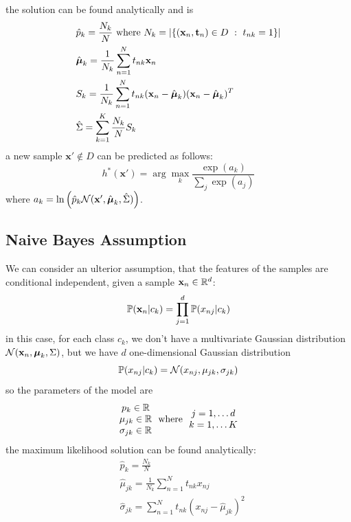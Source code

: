 \documentclass[10pt, letterpaper]{report}
\begin{document}
the solution can be found analytically and is\begin{align}
	 & \hat p_k=\frac{N_k}{N}\text{ where }N_k=|\{(\mathbf x_n,\mathbf t_n)\in D \ : \ t_{nk}=1\}| \\
	 & \hat{{\boldsymbol{\mu}}}_k=\frac{1}{N_k}\sum_{n=1}^Nt_{nk}\mathbf x_n                                       \\
	 & S_k=\frac{1}{N_k}\sum_{n=1}^Nt_{nk}(\mathbf x_n-\hat{{\boldsymbol{\mu}}}_k)(\mathbf x_n-\hat{{\boldsymbol{\mu}}}_k)^T       \\
	 & \hat \Sigma = \sum_{k=1}^{K}\frac{N_k}{N}S_k
\end{align}
a new sample $\mathbf x'\notin D$ can be predicted as follows:\begin{equation}
	h^*(\mathbf x')=\arg\max_k\frac{\exp(a_k)}{\sum_j\exp(a_j)}
\end{equation}
where $a_k=\ln\left(\hat p_k\mathcal N(\mathbf x',\hat{{\boldsymbol{\mu}}}_k,\hat\Sigma)\right)$.

\subsection{Naive Bayes Assumption}
We can consider an ulterior assumption, that the features of the samples are conditional independent, given a sample $\mathbf x_n\in {\mathbb R}^d$:\begin{equation}
	{\mathbb P}(\mathbf x_n|c_k)=\prod_{j=1}^d{\mathbb P}(x_{nj}|c_k)
\end{equation}
in this case, for each class $c_k$, we don't have a multivariate Gaussian distribution $\mathcal N(\mathbf x_n,{\boldsymbol{\mu}}_k,\Sigma)$, but we have $d$ one-dimensional Gaussian distribution\begin{equation}
	{\mathbb P}(x_{nj}|c_k)=\mathcal N(x_{nj},\mu_{jk},\sigma_{jk})
\end{equation}so the parameters of the model are
\begin{equation}
	\begin{matrix}
		p_k\in{\mathbb R}       \\
		\mu_{jk}\in {\mathbb R} \\
		\sigma_{jk}\in {\mathbb R}
	\end{matrix} \ \text{ where } \
	\begin{matrix}
		j=1,\dots d \\ k=1,\dots K
	\end{matrix}
\end{equation}
the maximum likelihood solution can be found analytically:
\begin{align}
	 & \hat p_k=\frac{N_k}{N}                                    \\
	 & \hat\mu_{jk}=\frac{1}{N_k}\sum_{n=1}^Nt_{nk}x_{nj}        \\
	 & \hat\sigma_{jk}=\sum_{n=1}^Nt_{nk}(x_{nj}-\hat\mu_{jk})^2
\end{align}
\end{document}
